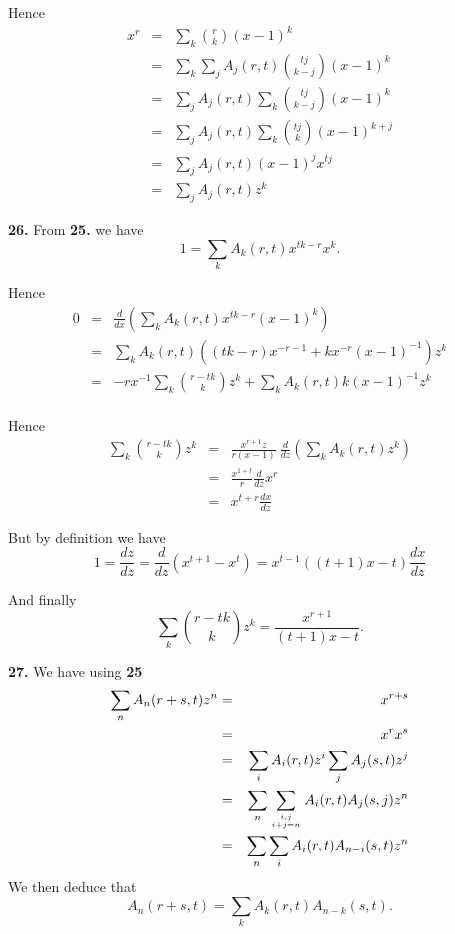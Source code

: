 \documentclass[a4paper,12pt]{article}
\newcommand{\newpar}[1]{\bigskip \noindent \textbf{#1.}}
\begin{document}
Hence
\begin{eqnarray*}
  x^r &=& \sum_k {r \choose k} (x-1)^k \\
  &=& \sum_k \sum_j A_j(r,t) {{tj} \choose {k-j}} (x-1)^k \\
  &=& \sum_j A_j(r,t) \sum_k {{tj} \choose {k-j}} (x-1)^k \\
  &=& \sum_j A_j(r,t) \sum_k {{tj} \choose k} (x-1)^{k+j} \\
  &=& \sum_j A_j(r,t) (x-1)^j x^{tj} \\
  &=& \sum_j A_j(r,t) z^k
\end{eqnarray*}

\newpar{26} From \textbf{25.} we have
\[ 1 = \sum_k A_k(r,t) x^{tk-r}x^k.\]

Hence
\begin{eqnarray*}
  0 &=& \frac{d}{dx} \left( \sum_k A_k(r,t) x^{tk-r}(x-1)^k \right) \\
  &=& \sum_k A_k(r,t) ((tk-r) x^{-r-1} + k x^{-r}(x-1)^{-1}) z^k \\
  &=& - r x^{-1} \sum_k {{r-tk} \choose k} z^k + \sum_k A_k(r,t) k
  (x-1)^{-1} z^k \\
\end{eqnarray*}

Hence
\begin{eqnarray*}
  \sum_k {{r-tk} \choose k} z^k &=& \frac{x^{r+1}z}{r(x-1)}\ \frac{d}{dz}
  \left( \sum_k A_k(r,t) z^k\right) \\
  &=& \frac{x^{1+t}}{r} \frac{d}{dz} x^r \\
  &=& x^{t+r} \frac{dx}{dz}
\end{eqnarray*}

But by definition we have
\[  1 = \frac{dz}{dz} = \frac{d}{dz}(x^{t+1}-x^t) = x^{t-1}((t+1)x - t)
\frac{dx}{dz} \]

And finally
\[ \sum_k {{r-tk} \choose k} z^k = \frac{x^{r+1}}{(t+1)x - t} .\]

\newpar{27} We have using \textbf{25}
\begin{eqnarray*}
  \sum_n A_n(r+s, t) z^n &=& x^{r+s} \\
  &=& x^r x^s \\
  &=& \sum_i A_i(r, t) z^i \sum_j A_j(s, t) z^j \\
  &=& \sum_n \sum_{i,j \atop i+j=n} A_i(r,t) A_j(s,j) z^n \\
  &=& \sum_n \sum_i A_i(r,t) A_{n-i}(s,t)z^n
\end{eqnarray*}
We then deduce that
\[ A_n(r+s,t) = \sum_k A_k(r,t) A_{n-k}(s,t).\]
\end{document}
